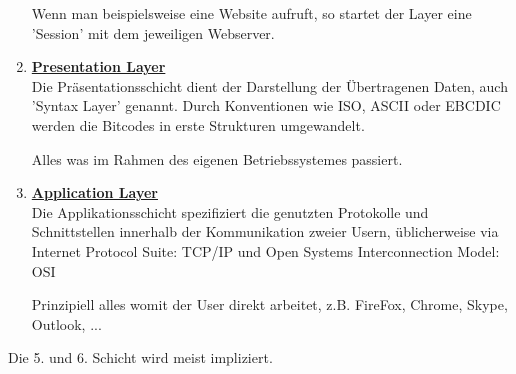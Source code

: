 \documentclass[11pt]{article}
\begin{document}
\begin{enumerate}
        Wenn man beispielsweise eine Website aufruft, so startet der Layer eine 'Session' mit dem jeweiligen Webserver.

        \item \textbf{\underline{Presentation Layer}}\\
        Die Präsentationsschicht dient der Darstellung der Übertragenen Daten, auch 'Syntax Layer' genannt.
        Durch Konventionen wie ISO, ASCII oder EBCDIC werden die Bitcodes in erste Strukturen umgewandelt.

        Alles was im Rahmen des eigenen Betriebssystemes passiert.

        \item \textbf{\underline{Application Layer}}\\
        Die Applikationsschicht spezifiziert die genutzten Protokolle und Schnittstellen innerhalb der Kommunikation
        zweier Usern, üblicherweise via Internet Protocol Suite: TCP/IP und Open Systems Interconnection Model: OSI

        Prinzipiell alles womit der User direkt arbeitet, z.B. FireFox, Chrome, Skype, Outlook, ...
    \end{enumerate}

    Die 5. und 6. Schicht wird meist impliziert.
\end{document}
